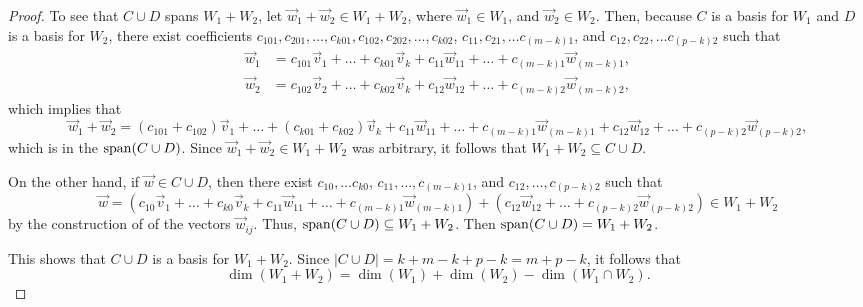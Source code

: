\documentclass{homework}
\begin{document}
\begin{proof}
		To see that $C \cup D$ spans $W_1 + W_2$, let $\vec{w}_1 + \vec{w}_2 \in W_1 + W_2$, where $\vec{w}_1 \in W_1$, and $\vec{w}_2 \in W_2$. Then, because $C$ is a basis for $W_1$ and $D$ is a basis for $W_2$, there exist coefficients $c_{101}, c_{201}, \dots, c_{k01}, c_{102}, c_{202}, \dots, c_{k02}$, $c_{11}, c_{21}, \dots c_{(m-k)1}$, and $c_{12}, c_{22}, \dots c_{(p-k)2}$ such that
		\begin{equation*}
			\begin{aligned}
			\vec{w}_1 &= c_{101}\vec{v}_1 + \dots + c_{k01}\vec{v}_k + c_{11}\vec{w}_{11} + \dots + c_{(m-k)1}\vec{w}_{(m-k)1}, \\
			\vec{w}_2 &= c_{102}\vec{v}_2 + \dots + c_{k02}\vec{v}_k + c_{12}\vec{w}_{12} + \dots + c_{(m-k)2}\vec{w}_{(m-k)2},
			\end{aligned}
		\end{equation*}
		which implies that
		\begin{equation*}
			\vec{w}_1 + \vec{w}_2 = (c_{101} + c_{102})\vec{v}_1 + \dots + (c_{k01} + c_{k02})\vec{v}_k + c_{11}\vec{w}_11 + \dots + c_{(m-k)1}\vec{w}_{(m-k)1} + c_{12}\vec{w}_{12} + \dots + c_{(p-k)2}\vec{w}_{(p-k)2},
		\end{equation*}
		which is in the $\mathrm{span}(C \cup D)$. Since $\vec{w}_1 + \vec{w}_2 \in W_1 + W_2$ was arbitrary, it follows that $W_1 + W_2 \subseteq C \cup D$. 
		
		On the other hand, if $\vec{w} \in C \cup D$, then there exist $c_{10}, \dots c_{k0}$, $c_{11}, \dots, c_{(m-k)1}$, and $c_{12}, \dots, c_{(p-k)2}$ such that
		\begin{equation*}
			\vec{w} = (c_{10}\vec{v}_1 + \dots + c_{k0}\vec{v}_k + c_{11}\vec{w}_{11} + \dots + c_{(m-k)1}\vec{w}_{(m-k)1}) + (c_{12}\vec{w}_{12} + \dots + c_{(p-k)2}\vec{w}_{(p-k)2}) \in W_1 + W_2
		\end{equation*}
		by the construction of of the vectors $\vec{w}_{ij}$. Thus, $\mathrm{span}(C \cup D) \subseteq W_1 + W_2$. Then $\mathrm{span}(C\cup D) = W_1 + W_2$.
		
		This shows that $C\cup D$ is a basis for $W_1 + W_2$. Since $|C\cup D| = k + m-k + p-k = m + p - k$, it follows that
		\begin{equation*}
			\dim(W_1 + W_2) = \dim(W_1) + \dim(W_2) - \dim(W_1 \cap W_2).
		\end{equation*}
	\end{proof}
	
\end{document}
